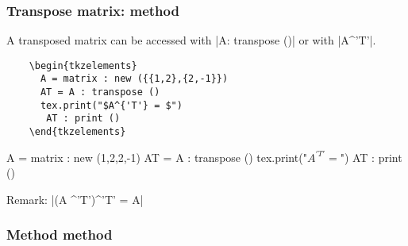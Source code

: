 \subsubsection{Transpose matrix: method  } %
\label{ssub:transpose_matrix}

A transposed matrix can be accessed with |A: transpose ()| or with |A^{'T'}|.

\vspace{.5em}
\begin{minipage}{.6\textwidth}
  \begin{Verbatim}
    \begin{tkzelements}
      A = matrix : new ({{1,2},{2,-1}}) 
      AT = A : transpose ()
      tex.print("$A^{'T'} = $")
       AT : print ()
    \end{tkzelements}
  \end{Verbatim}
\end{minipage}
\begin{minipage}{.4\textwidth}
    \begin{tkzelements}
      A = matrix : new ({{1,2},{2,-1}}) 
      AT = A : transpose ()
      tex.print("$A^{'T'} = $")
       AT : print ()
    \end{tkzelements}
\end{minipage}

\vspace{.5em}
Remark: |(A ^'T')^'T' = A|


\subsubsection{Method method  } %
\label{ssub:method_adjugate}

